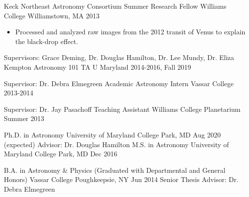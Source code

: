 \documentclass[]{awesome-cv}
\begin{document}
\begin{cventries}
	\vspace{-6mm}
	\cventry
	{Keck Northeast Astronomy Consortium Summer Research Fellow}
	{Williams College}
	{Williamstown, MA}
	{2013}
	{\vspace{-3mm}
		\begin{itemize}
			\item Processed and analyzed raw images from the 2012 transit of Venus to explain the black-drop effect.
	\end{itemize}}
\end{cventries}

\vspace{-5mm}

\begin{cventries}

	\cventry
	{Supervisors: Grace Deming, Dr. Douglas Hamilton, Dr. Lee Mundy, Dr. Eliza Kempton}
	{Astronomy 101 TA}
	{U Maryland}
	{2014-2016, Fall 2019}
	{}
		
	\vspace{-6mm}
	\cventry
	{Supervisor: Dr. Debra Elmegreen}
	{Academic Astronomy Intern}
	{Vassar College}
	{2013-2014}
	{}
		
	\vspace{-6mm}
	\cventry
	{Supervisor: Dr. Jay Pasachoff}
	{Teaching Assistant}
	{Williams College Planetarium}
	{Summer 2013}
	{}
\end{cventries}

\vspace{-5mm}

\begin{cventries}
	\cventry
	{Ph.D. in Astronomy}
	{University of Maryland}
	{College Park, MD}
	{Aug 2020 (expected)}
	{Advisor: Dr. Douglas Hamilton}
	\cventry
	{M.S. in Astronomy}
	{University of Maryland}
	{College Park, MD}
	{Dec 2016}
	{}
	
	\vspace{-6mm}
	\cventry
	{B.A. in Astronomy \& Physics (Graduated with Departmental and General Honors)}
	{Vassar College}
	{Poughkeepsie, NY}
	{Jun 2014}
	{Senior Thesis Advisor: Dr. Debra Elmegreen}
\end{cventries}

\end{document}
